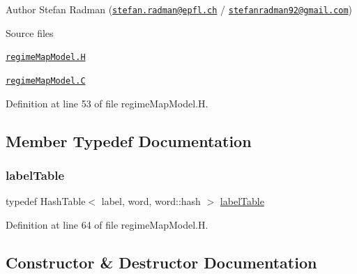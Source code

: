 \label{_Description}%
 Author Stefan Radman (\href{mailto:stefan.radman@epfl.ch}{\tt stefan.\+radman@epfl.\+ch} / \href{mailto:stefanradman92@gmail.com}{\tt stefanradman92@gmail.\+com})

\begin{DoxyParagraph}{Source files}

\begin{DoxyItemize}
\item \href{../../../home/carlo/data/GeN-Foam/GeN-Foam_ffn/GeN-Foam/GeN-Foam/classes/thermalHydraulics/src/physicsModels/regimeMapModels/regimeMapModel.H}{\tt regime\+Map\+Model.\+H} 
\item \href{../../../home/carlo/data/GeN-Foam/GeN-Foam_ffn/GeN-Foam/GeN-Foam/classes/thermalHydraulics/src/physicsModels/regimeMapModels/regimeMapModel.C}{\tt regime\+Map\+Model.\+C} 
\end{DoxyItemize}
\end{DoxyParagraph}


Definition at line 53 of file regime\+Map\+Model.\+H.



\subsection{Member Typedef Documentation}
\mbox{\label{classFoam_1_1regimeMapModel_a5b5512e1ee06ad6419a57dd400b53807}} 
\subsubsection{\texorpdfstring{label\+Table}{labelTable}}
{\footnotesize\ttfamily typedef Hash\+Table$<$ label, word, word\+::hash $>$ \hyperlink{classFoam_1_1regimeMapModel_a5b5512e1ee06ad6419a57dd400b53807}{label\+Table}\hspace{0.3cm}{\ttfamily [protected]}}



Definition at line 64 of file regime\+Map\+Model.\+H.



\subsection{Constructor \& Destructor Documentation}
\mbox{\label{classFoam_1_1regimeMapModel_ad19256b66990468e25c2300bdd854d82}} 
